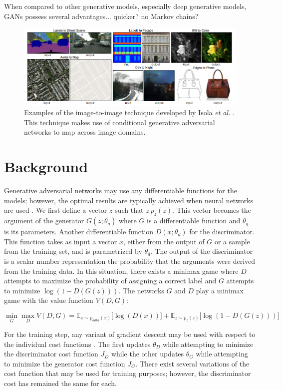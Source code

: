 \documentclass[11pt]{article}
\begin{document}
When compared to other generative models, especially deep generative models, GANs possess several advantages... quicker? no Markov chains?

\begin{figure}
\centering
\includegraphics[scale=0.55]{img2img}
\caption{Examples of the image-to-image technique developed by Isola \textit{et al.} \citep{2016arXiv161107004I}. This technique makes use of conditional generative adversarial networks to map across image domains.}
\label{fig:Image to Image Examples}
\end{figure}

\section{Background}
Generative adversarial networks may use any differentiable functions for the models; however, the optimal results are typically achieved when neural networks are used \citep{2014arXiv1406.2661G}. We first define a vector $z$ such that $z~p_z(z)$. This vector becomes the argument of the generator $G(z;\theta_g)$ where $G$ is a differentiable function and $\theta_g$ is its parameters. Another differentiable function $D(x;\theta_d)$ for the discriminator. This function takes as input a vector $x$, either from the output of $G$ or a sample from the training set, and is parametrized by $\theta_d$. The output of the discriminator is a scalar number representation the probability that the arguments were derived from the training data. In this situation, there exists a minimax game where $D$ attempts to maximize the probability of assigning a correct label and $G$ attempts to minimize $\log(1-D(G(z)))$. The networks $G$ and $D$ play a minimax game with the value function $V(D,G)$:

$$\min_{G}\max_{D}V(D, G) = \mathbb{E}_{x\sim p_{data}(x)}\Big[\log(D(x))\Big] + \mathbb{E}_{z\sim p_z(z)}\Big[\log(1-D(G(z)))\Big]$$

For the training step, any variant of gradient descent may be used with respect to the individual cost functions \citep{2017arXiv170100160G}. The first updates $\theta_D$ while attempting to minimize the discriminator cost function $J_D$ while the other updates $\theta_G$ while attempting to minimize the generator cost function $J_G$. There exist several variations of the cost function that may be used for training purposes; however, the discriminator cost has remained the same for each.
\end{document}
